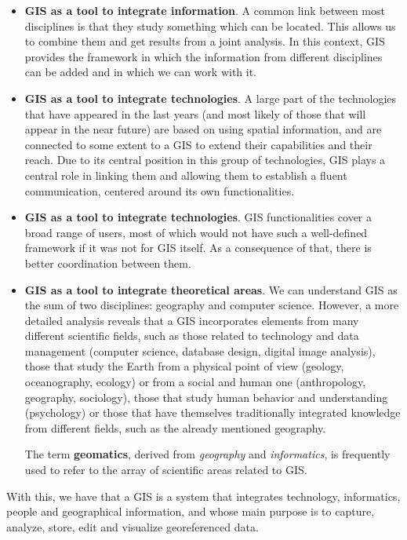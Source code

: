 \begin{itemize}
\item \textbf{GIS as a tool to integrate information}. A common link between most disciplines is that they study something which can be located. This allows us to combine them and get results from a joint analysis. In this context, GIS provides the framework in which the information from different disciplines can be added and in which we can work with it.
\item \textbf{GIS as a tool to integrate technologies}. A large part of the technologies that have appeared in the last years (and most likely of those that will appear in the near future) are based on using spatial information, and are connected to some extent to a GIS to extend their capabilities and their reach. Due to its central position in this group of technologies, GIS plays a central role in linking them and allowing them to establish a fluent communication, centered around its own functionalities.
\item \textbf{GIS as a tool to integrate technologies}. GIS functionalities cover a broad range of users, most of which would not have such a well-defined framework if it was not for GIS itself. As a consequence of that, there is  better coordination between them.
\item \textbf{GIS as a tool to integrate theoretical areas}. We can understand GIS as the sum of two disciplines: geography and computer science. However, a more detailed analysis reveals that a GIS incorporates elements from many different scientific fields, such as those related to technology and data management (computer science, database design, digital image analysis), those that study the Earth from a physical point of view (geology, oceanography, ecology) or from a social and human one (anthropology, geography, sociology), those that study human behavior and understanding (psychology) or those that have themselves traditionally integrated knowledge from different fields, such as the already mentioned geography.

The term \textbf{geomatics}, derived from \emph{geography} and \emph{informatics}, is frequently used to refer to the array of scientific areas related to GIS.
\end{itemize}

With this, we have that a GIS is a system that integrates technology, informatics, people and geographical information, and whose main purpose is to capture, analyze, store, edit and visualize georeferenced data.

